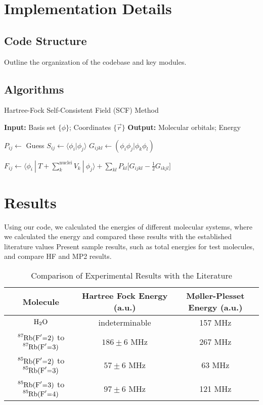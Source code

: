 \documentclass[12pt]{article}
\begin{document}
\section{Implementation Details}

\subsection{Code Structure}
Outline the organization of the codebase and key modules.

\subsection{Algorithms}

\begin{algorithm}
\caption{Hartree-Fock Self-Consistent Field (SCF) Method}
\begin{algorithmic}[1]

\Statex \textbf{Input:} Basis set $\{\phi\}$; Coordinates $\{\vec{r}\}$
\Statex \textbf{Output:} Molecular orbitals; Energy

\State $P_{ij} \gets $ Guess
\State $S_{ij} \gets \langle \phi_i | \phi_j \rangle$ 
\State $G_{ijkl} \gets (\phi_i\phi_j|\phi_k\phi_l)$ 

    \State $F_{ij} \gets \langle \phi_i \: | \: T + \sum_k^{\text{nuclei}}V_k \: |\: \phi_j \rangle + \sum_{kl} P_{kl} \Big[ G_{ijkl} - \frac{1}{2} G_{ikjl} \Big]$

\EndWhile


\end{algorithmic}
\end{algorithm}

\section{Results}
Using our code, we calculated the energies of different molecular systems, where we calculated the energy and compared these results with the established literature values
Present sample results, such as total energies for test molecules, and compare HF and MP2 results.
\begin{table}[H]
    \centering
    \begin{tabular}{||c|c|c||}
        \hline
        \textbf{Molecule} & \textbf{Hartree Fock Energy (a.u.)} & \textbf{Møller-Plesset Energy (a.u.)} \\
        \hline
        $\ce{H2O}$ & indeterminable & 157 MHz\\
        \hline
        $\ce{^87Rb(F^\prime=2)}$ to $\ce{^87Rb(F^\prime=3)}$ & $186 \pm 6$ MHz & 267 MHz\\
        \hline
        $\ce{^85Rb(F^\prime=2)}$ to $\ce{^85Rb(F^\prime=3)}$ & $57 \pm 6$ MHz & 63 MHz\\
        \hline
        $\ce{^85Rb(F^\prime=3)}$ to $\ce{^85Rb(F^\prime=4)}$ & $97 \pm 6$ MHz & 121 MHz\\
        \hline
    \end{tabular}
    \caption{Comparison of Experimental Results with the Literature}
\end{table}
\end{document}
